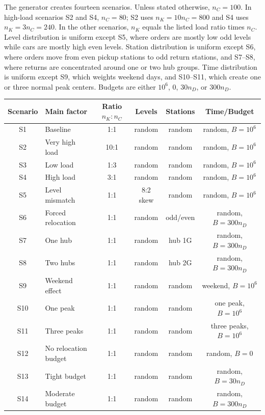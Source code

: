 \documentclass[10pt,a4paper]{article}
\begin{document}
The generator creates fourteen scenarios.  Unless stated otherwise, $n_C=100$.
In high-load scenarios S2 and S4, $n_C=80$; S2 uses $n_K=10n_C=800$ and
S4 uses $n_K=3n_C=240$.  In the other scenarios, $n_K$ equals the listed load
ratio times $n_C$.  Level distribution is uniform
except S5, where orders are mostly low odd levels while cars are mostly high
even levels.  Station distribution is uniform except S6, where orders move from
even pickup stations to odd return stations, and S7--S8, where returns are
concentrated around one or two hub groups.  Time distribution is uniform except
S9, which weights weekend days, and S10--S11, which create one or three normal
peak centers.  Budgets are either $10^6$, $0$, $30n_D$, or $300n_D$.

\begin{table}[ht]
\centering
\small
\begin{tabular}{clcccc}
\toprule
Scenario & Main factor & Ratio $n_K:n_C$ & Levels & Stations & Time/Budget \\
\midrule
S1 & Baseline & 1:1 & random & random & random, $B=10^6$\\
S2 & Very high load & 10:1 & random & random & random, $B=10^6$\\
S3 & Low load & 1:3 & random & random & random, $B=10^6$\\
S4 & High load & 3:1 & random & random & random, $B=10^6$\\
S5 & Level mismatch & 1:1 & 8:2 skew & random & random, $B=10^6$\\
S6 & Forced relocation & 1:1 & random & odd/even & random, $B=300n_D$\\
S7 & One hub & 1:1 & random & hub 1G & random, $B=300n_D$\\
S8 & Two hubs & 1:1 & random & hub 2G & random, $B=300n_D$\\
S9 & Weekend effect & 1:1 & random & random & weekend, $B=10^6$\\
S10 & One peak & 1:1 & random & random & one peak, $B=10^6$\\
S11 & Three peaks & 1:1 & random & random & three peaks, $B=10^6$\\
S12 & No relocation budget & 1:1 & random & random & random, $B=0$\\
S13 & Tight budget & 1:1 & random & random & random, $B=30n_D$\\
S14 & Moderate budget & 1:1 & random & random & random, $B=300n_D$\\
\bottomrule
\end{tabular}
\end{table}
\end{document}
